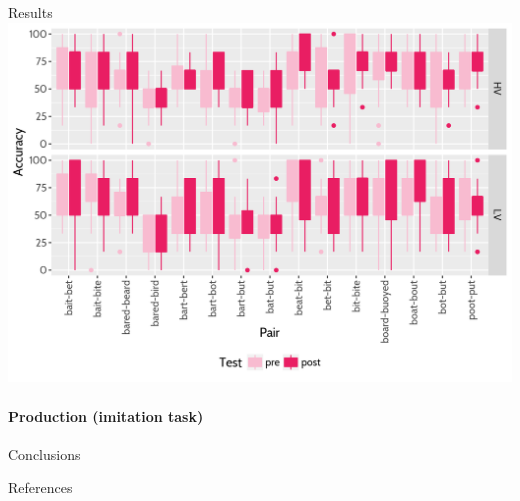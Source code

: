 \documentclass[final,xcolor={cmyk,hyperref}]{beamer}
\begin{document}
\begin{frame}[t]
\begin{columns}[t]
\begin{column}{0.5\linewidth}
\begin{block}{Results}
\includegraphics[width=\linewidth]{plots/axb-boxplot.png}

\paragraph{Production (imitation task)}
\end{block}

\begin{block}{Conclusions}

\end{block}

\begin{block}{References}
  \renewcommand\bibfont{\small}
  \printbibliography
\end{block}


\end{column}

\end{columns}

\end{frame}
\end{document}
